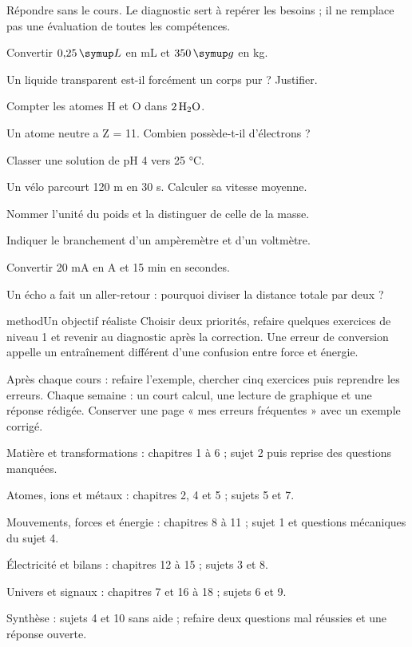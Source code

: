 Répondre sans le cours. Le diagnostic sert à repérer les besoins ; il ne remplace pas une évaluation de toutes les compétences.\par
\begin{questions}
\item Convertir $0{,}25\unite L$ en mL et $350\unite g$ en kg.
\item Un liquide transparent est-il forcément un corps pur ? Justifier.
\item Compter les atomes H et O dans $2\,\ce{H2O}$.
\item Un atome neutre a Z = 11. Combien possède-t-il d’électrons ?
\item Classer une solution de pH 4 vers 25 °C.
\item Un vélo parcourt 120 m en 30 s. Calculer sa vitesse moyenne.
\item Nommer l’unité du poids et la distinguer de celle de la masse.
\item Indiquer le branchement d’un ampèremètre et d’un voltmètre.
\item Convertir 20 mA en A et 15 min en secondes.
\item Un écho a fait un aller-retour : pourquoi diviser la distance totale par deux ?
\end{questions}
\begin{pcEncadre}{method}{Un objectif réaliste}
Choisir deux priorités, refaire quelques exercices de niveau 1 et revenir au diagnostic après la correction. Une erreur de conversion appelle un entraînement différent d’une confusion entre force et énergie.
\end{pcEncadre}
\clearpage{}
Après chaque cours : refaire l’exemple, chercher cinq exercices puis reprendre les erreurs. Chaque semaine : un court calcul, une lecture de graphique et une réponse rédigée. Conserver une page « mes erreurs fréquentes » avec un exemple corrigé.
\begin{questions}
\item Matière et transformations : chapitres 1 à 6 ; sujet 2 puis reprise des questions manquées.
\item Atomes, ions et métaux : chapitres 2, 4 et 5 ; sujets 5 et 7.
\item Mouvements, forces et énergie : chapitres 8 à 11 ; sujet 1 et questions mécaniques du sujet 4.
\item Électricité et bilans : chapitres 12 à 15 ; sujets 3 et 8.
\item Univers et signaux : chapitres 7 et 16 à 18 ; sujets 6 et 9.
\item Synthèse : sujets 4 et 10 sans aide ; refaire deux questions mal réussies et une réponse ouverte.
\end{questions}
